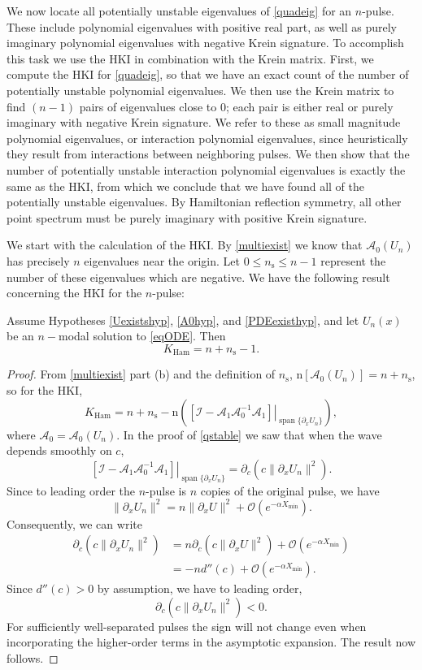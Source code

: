 \documentclass[review,onefignum,onetabnum]{siamart171218}
\def\Ham{\mathop\mathrm{Ham}\nolimits}
\def\Span{\mathop\mathrm{span}\nolimits}
\newcommand{\rmn}{\mathrm{n}}
\newcommand{\rms}{\mathrm{s}}
\newcommand{\calA}{\mathcal{A}}
\newcommand{\calI}{\mathcal{I}}
\begin{document}
We now locate all potentially unstable eigenvalues of \cref{quadeig} for an $n$-pulse. These include polynomial eigenvalues with positive real part, as well as purely imaginary polynomial eigenvalues with negative Krein signature. To accomplish this task we use the HKI in combination with the Krein matrix. First, we compute the HKI for \cref{quadeig}, so that  we have an exact count of the number of potentially unstable polynomial eigenvalues. We then use the Krein matrix to find $(n-1)$ pairs of eigenvalues close to 0; each pair is either real or purely imaginary with negative Krein signature. We refer to these as small magnitude polynomial eigenvalues, or interaction polynomial eigenvalues, since heuristically they result from interactions between neighboring pulses. We then show that the number of potentially unstable interaction polynomial eigenvalues is exactly the same as the HKI, from which we conclude that we have found all of the potentially unstable eigenvalues. By Hamiltonian reflection symmetry, all other point spectrum must be purely imaginary with positive Krein signature.

We start with the calculation of the HKI. By \cref{multiexist} we know that $\calA_0(U_n)$ has precisely $n$ eigenvalues near the origin. Let $0\le n_\rms\le n-1$ represent the number of these eigenvalues which are negative. We have the following result concerning the HKI for the $n$-pulse:

\begin{lemma}\label{lem:HKImulti}
Assume Hypotheses \ref{Uexistshyp}, \ref{A0hyp}, and \ref{PDEexisthyp}, and let $U_n(x)$ be an $n-$modal solution to \cref{eqODE}. Then
\[
K_{\Ham}=n+n_\rms-1.
\]
\end{lemma}

\begin{proof}
From \cref{multiexist} part (b) and the definition of $n_\rms$, $\rmn[\calA_0(U_n)]=n+n_\rms$, so for the HKI,
\[
K_{\Ham}=n+n_\rms-
\rmn\left(\left.\left[\calI-\calA_1\calA_0^{-1}\calA_1\right]\right|_{\Span\{\partial_xU_n\}}\right),
\]
where $\calA_0=\calA_0(U_n)$.
In the proof of \cref{qstable} we saw that when the wave depends smoothly on $c$,
\[
\left.\left[\calI-\calA_1\calA_0^{-1}\calA_1\right]\right|_{\Span\{\partial_xU_n\}}=
\partial_c\left(c\|\partial_x U_n\|^2\right).
\]
Since to leading order the $n$-pulse is $n$ copies of the original pulse, we have
\[
\|\partial_x U_n\|^2=n\|\partial_xU\|^2 + \mathcal{O}(e^{-\alpha X_{\mathrm{min}}}).
\]
Consequently, we can write
\begin{align*}
\partial_c\left(c\|\partial_x U_n\|^2\right) &=
n\partial_c\left(c\|\partial_x U\|^2\right) + \mathcal{O}(e^{-\alpha X_{\mathrm{min}}})\\
&=-nd''(c) + \mathcal{O}(e^{-\alpha X_{\mathrm{min}}}).
\end{align*}
Since $d''(c)>0$ by assumption, we have to leading order,
\[
\partial_c\left(c\|\partial_x U_n\|^2\right)<0.
\]
For sufficiently well-separated pulses the sign will not change even when incorporating the higher-order terms in the asymptotic expansion. The result now follows.
\end{proof}
\end{document}
